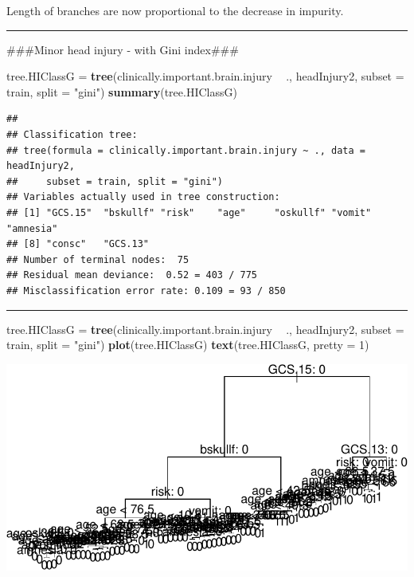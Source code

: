 \documentclass[]{article}
\newenvironment{Shaded}{\begin{snugshade}}{\end{snugshade}}
\newcommand{\DataTypeTok}[1]{\textcolor[rgb]{0.13,0.29,0.53}{#1}}
\newcommand{\DecValTok}[1]{\textcolor[rgb]{0.00,0.00,0.81}{#1}}
\newcommand{\KeywordTok}[1]{\textcolor[rgb]{0.13,0.29,0.53}{\textbf{#1}}}
\newcommand{\NormalTok}[1]{#1}
\newcommand{\OperatorTok}[1]{\textcolor[rgb]{0.81,0.36,0.00}{\textbf{#1}}}
\newcommand{\StringTok}[1]{\textcolor[rgb]{0.31,0.60,0.02}{#1}}
\begin{document}
Length of branches are now proportional to the decrease in impurity.

\begin{center}\rule{0.5\linewidth}{\linethickness}\end{center}

\#\#\#Minor head injury - with Gini index\#\#\#

\footnotesize

\begin{Shaded}
\begin{Highlighting}[]
\NormalTok{tree.HIClassG =}\StringTok{ }\KeywordTok{tree}\NormalTok{(clinically.important.brain.injury }\OperatorTok{~}\StringTok{ }\NormalTok{., headInjury2, }
    \DataTypeTok{subset =}\NormalTok{ train, }\DataTypeTok{split =} \StringTok{"gini"}\NormalTok{)}
\KeywordTok{summary}\NormalTok{(tree.HIClassG)}
\end{Highlighting}
\end{Shaded}

\begin{verbatim}
## 
## Classification tree:
## tree(formula = clinically.important.brain.injury ~ ., data = headInjury2, 
##     subset = train, split = "gini")
## Variables actually used in tree construction:
## [1] "GCS.15"  "bskullf" "risk"    "age"     "oskullf" "vomit"   "amnesia"
## [8] "consc"   "GCS.13" 
## Number of terminal nodes:  75 
## Residual mean deviance:  0.52 = 403 / 775 
## Misclassification error rate: 0.109 = 93 / 850
\end{verbatim}

\normalsize

\begin{center}\rule{0.5\linewidth}{\linethickness}\end{center}

\begin{Shaded}
\begin{Highlighting}[]
\NormalTok{tree.HIClassG =}\StringTok{ }\KeywordTok{tree}\NormalTok{(clinically.important.brain.injury }\OperatorTok{~}\StringTok{ }\NormalTok{., headInjury2, }
    \DataTypeTok{subset =}\NormalTok{ train, }\DataTypeTok{split =} \StringTok{"gini"}\NormalTok{)}
\KeywordTok{plot}\NormalTok{(tree.HIClassG)}
\KeywordTok{text}\NormalTok{(tree.HIClassG, }\DataTypeTok{pretty =} \DecValTok{1}\NormalTok{)}
\end{Highlighting}
\end{Shaded}

\includegraphics{8Trees_files/figure-latex/unnamed-chunk-15-1.pdf}
\end{document}
